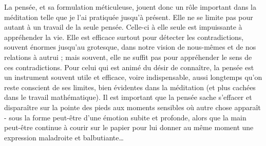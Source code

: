 La pensée, et sa formulation méticuleuse, jouent donc un rôle important dans la méditation telle que je l'ai pratiquée jusqu'à présent. Elle ne se limite pas pour autant à un travail de la seule pensée. Celle-ci à elle seule est impuissante à appréhender la vie. Elle est efficace surtout pour détecter les contradictions, souvent énormes jusqu'au grotesque, dans notre vision de nous-mêmes et de nos relations à autrui ; mais souvent, elle ne suffit pas pour appréhender le sens de ces contradictions. Pour celui qui est animé du désir de connaître, la pensée est un instrument souvent utile et efficace, voire indispensable, aussi longtemps qu'on reste conscient de ses limites, bien évidentes dans la méditation (et plus cachées dans le travail mathématique). Il est important que la pensée sache s'effacer et disparaître sur la pointe des pieds aux moments sensibles où autre chose apparaît - sous la forme peut-être d'une émotion subite et profonde, alors que la main peut-être continue à courir sur le papier pour lui donner au même moment une expression maladroite et balbutiante\ldots
